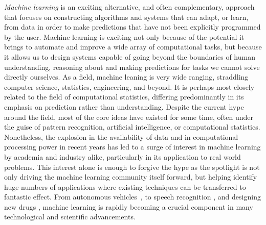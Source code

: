 \emph{Machine learning} is an exciting alternative, and often complementary,
approach that focuses on constructing algorithms and systems that can adapt, or learn, from data in order
to make predictions that have not been explicitly programmed by the user.
Machine learning is exciting not only because of the potential it brings
to automate and improve a wide array of computational tasks, but because it allows us to design 
systems capable of going beyond the boundaries of human understanding, reasoning
about and making predictions for tasks we cannot solve directly ourselves.
As a field, machine leaning is very wide ranging,
straddling computer science, statistics, engineering, and beyond. 
It is perhaps most closely related to the field of computational statistics, differing predominantly
in its emphasis on prediction rather than understanding.  Despite the current hype around the
field, most of the core ideas have existed for some
time, often under the guise of pattern recognition, artificial intelligence, or computational 
statistics.  Nonetheless, the explosion in the availability of data and in computational processing power in recent
years has led to a surge of interest in machine learning by academia and industry alike, particularly 
in its application to real world problems.  This interest alone is enough to forgive the hype as the
spotlight is not only driving the machine learning community itself forward, but helping identify
huge numbers of applications where existing techniques can be transferred to fantastic effect.
From autonomous vehicles~\citep{lefevre2014survey}, to speech recognition \citep{jurafsky2014speech},
and designing new drugs \citep{burbidge2001drug}, machine learning is rapidly becoming a 
crucial component in many technological and scientific advancements.  


